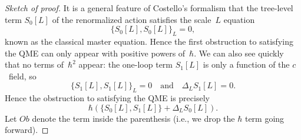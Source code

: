 \begin{proof}[Sketch of proof]
It is a general feature of Costello's formalism that the tree-level term $S_0[L]$ of the renormalized action satisfies the scale~$L$ equation
\[
\{S_0[L],S_0[L]\}_L = 0,
\]
known as the classical master equation.
Hence the first obstruction to satisfying the QME can only appear with positive powers of~$\hbar$.
We can also see quickly that no terms of~$\hbar^2$ appear:
the one-loop term $S_1[L]$ is only a function of the $c$~field, 
so 
\[
\{S_1[L],S_1[L]\}_L = 0 \quad\text{and}\quad \Delta_L S_1[L] = 0.
\]
Hence the obstruction to satisfying the QME is precisely
\[
\hbar\left( \{S_0[L],S_1[L]\} + \Delta_L S_0[L] \right).
\]
Let $Ob$ denote the term inside the parenthesis (i.e., we drop the $\hbar$ term going forward).
\end{proof}
